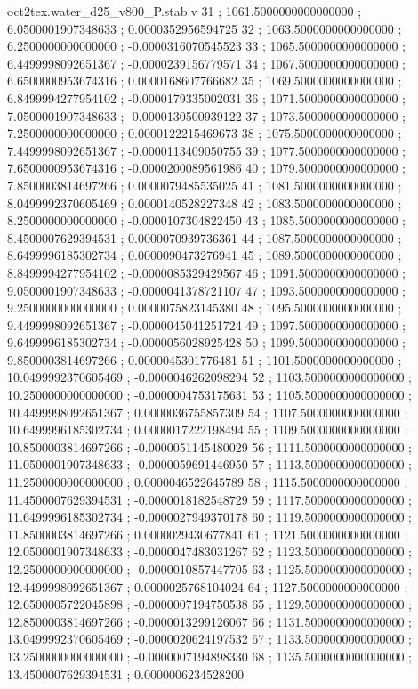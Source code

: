\begin{filecontents}[overwrite]{oct2tex.water_d25_v800_P.stab.v}
31 ; 1061.5000000000000000 ; 6.0500001907348633 ; 0.0000352956594725
32 ; 1063.5000000000000000 ; 6.2500000000000000 ; -0.0000316070545523
33 ; 1065.5000000000000000 ; 6.4499998092651367 ; -0.0000239156779571
34 ; 1067.5000000000000000 ; 6.6500000953674316 ; 0.0000168607766682
35 ; 1069.5000000000000000 ; 6.8499994277954102 ; -0.0000179335002031
36 ; 1071.5000000000000000 ; 7.0500001907348633 ; -0.0000130500939122
37 ; 1073.5000000000000000 ; 7.2500000000000000 ; 0.0000122215469673
38 ; 1075.5000000000000000 ; 7.4499998092651367 ; -0.0000113409050755
39 ; 1077.5000000000000000 ; 7.6500000953674316 ; -0.0000200089561986
40 ; 1079.5000000000000000 ; 7.8500003814697266 ; 0.0000079485535025
41 ; 1081.5000000000000000 ; 8.0499992370605469 ; 0.0000140528227348
42 ; 1083.5000000000000000 ; 8.2500000000000000 ; -0.0000107304822450
43 ; 1085.5000000000000000 ; 8.4500007629394531 ; 0.0000070939736361
44 ; 1087.5000000000000000 ; 8.6499996185302734 ; 0.0000090473276941
45 ; 1089.5000000000000000 ; 8.8499994277954102 ; -0.0000085329429567
46 ; 1091.5000000000000000 ; 9.0500001907348633 ; -0.0000041378721107
47 ; 1093.5000000000000000 ; 9.2500000000000000 ; 0.0000075823145380
48 ; 1095.5000000000000000 ; 9.4499998092651367 ; -0.0000045041251724
49 ; 1097.5000000000000000 ; 9.6499996185302734 ; -0.0000056028925428
50 ; 1099.5000000000000000 ; 9.8500003814697266 ; 0.0000045301776481
51 ; 1101.5000000000000000 ; 10.0499992370605469 ; -0.0000046262098294
52 ; 1103.5000000000000000 ; 10.2500000000000000 ; -0.0000004753175631
53 ; 1105.5000000000000000 ; 10.4499998092651367 ; 0.0000036755857309
54 ; 1107.5000000000000000 ; 10.6499996185302734 ; 0.0000017222198494
55 ; 1109.5000000000000000 ; 10.8500003814697266 ; -0.0000051145480029
56 ; 1111.5000000000000000 ; 11.0500001907348633 ; -0.0000059691446950
57 ; 1113.5000000000000000 ; 11.2500000000000000 ; 0.0000046522645789
58 ; 1115.5000000000000000 ; 11.4500007629394531 ; -0.0000018182548729
59 ; 1117.5000000000000000 ; 11.6499996185302734 ; -0.0000027949370178
60 ; 1119.5000000000000000 ; 11.8500003814697266 ; 0.0000029430677841
61 ; 1121.5000000000000000 ; 12.0500001907348633 ; -0.0000047483031267
62 ; 1123.5000000000000000 ; 12.2500000000000000 ; -0.0000010857447705
63 ; 1125.5000000000000000 ; 12.4499998092651367 ; 0.0000025768104024
64 ; 1127.5000000000000000 ; 12.6500005722045898 ; -0.0000007194750538
65 ; 1129.5000000000000000 ; 12.8500003814697266 ; -0.0000013299126067
66 ; 1131.5000000000000000 ; 13.0499992370605469 ; -0.0000020624197532
67 ; 1133.5000000000000000 ; 13.2500000000000000 ; -0.0000007194898330
68 ; 1135.5000000000000000 ; 13.4500007629394531 ; 0.0000006234528200

\end{filecontents}
